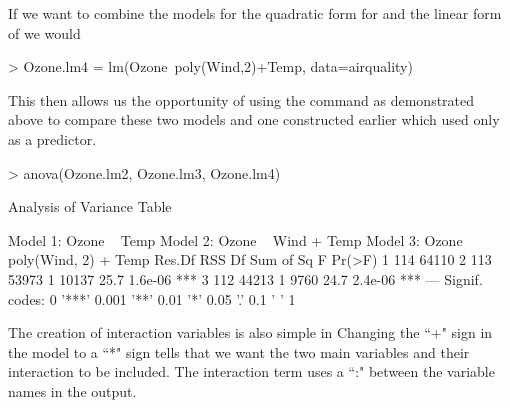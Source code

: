 If we want to combine the models for the quadratic form for  and the linear form of  we would 

\begin{Schunk}
\begin{Sinput}
> Ozone.lm4 = lm(Ozone~poly(Wind,2)+Temp, data=airquality) 
\end{Sinput}
\end{Schunk}

This then allows us the opportunity of using the  command as demonstrated above to compare these two models and one constructed earlier which used only  as a predictor. 

\begin{Schunk}
\begin{Sinput}
> anova(Ozone.lm2, Ozone.lm3, Ozone.lm4) 
\end{Sinput}
\begin{Soutput}
Analysis of Variance Table

Model 1: Ozone ~ Temp
Model 2: Ozone ~ Wind + Temp
Model 3: Ozone ~ poly(Wind, 2) + Temp
  Res.Df   RSS Df Sum of Sq    F  Pr(>F)    
1    114 64110                              
2    113 53973  1     10137 25.7 1.6e-06 ***
3    112 44213  1      9760 24.7 2.4e-06 ***
---
Signif. codes:  
0 '***' 0.001 '**' 0.01 '*' 0.05 '.' 0.1 ' ' 1
\end{Soutput}
\end{Schunk}

 
The creation of interaction variables is also simple in \R{} Changing the ``+" sign in the model to a ``*" sign tells \R{} that we want the two main variables and their interaction to be included. The interaction term uses a ``:" between the variable names in the output. 

